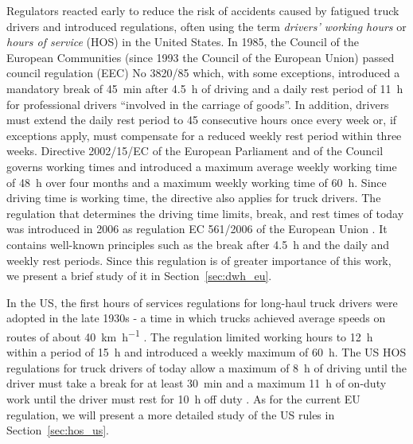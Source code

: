 Regulators reacted early to reduce the risk of accidents caused by fatigued truck drivers and introduced regulations, often using the term \emph{drivers' working hours} or \emph{hours of service} (HOS) in the United States. In 1985, the Council of the European Communities (since 1993 the Council of the European Union) passed council regulation (EEC) No 3820/85 \cite{counciloftheeuropeancommunities:1985} which, with some exceptions, introduced a mandatory break of \SI{45}{\minute} after \SI{4.5}{\hour} of driving and a daily rest period of \SI{11}{\hour} for professional drivers ``involved in the carriage of goods''. In addition, drivers must extend the daily rest period to \si{45} consecutive hours once every week or, if exceptions apply, must compensate for a reduced weekly rest period within three weeks. Directive 2002/15/EC \cite{europeanparliament:2002} of the European Parliament and of the Council governs working times and introduced a maximum average weekly working time of \SI{48}{\hour} over four months and a maximum weekly working time of \SI{60}{\hour}. Since driving time is working time, the directive also applies for truck drivers. The regulation that determines the driving time limits, break, and rest times of today was introduced in 2006 as regulation EC 561/2006 of the European Union \cite{europeanparliament:2006}. It contains well-known principles such as the break after \SI{4.5}{\hour} and the daily and weekly rest periods. Since this regulation is of greater importance of this work, we present a brief study of it in Section~\ref{sec:dwh_eu}.

In the US, the first hours of services regulations for long-haul truck drivers were adopted in the late 1930s - a time in which trucks achieved average speeds on routes of about \SI[per-mode = symbol]{40}{\km\per\hour} \cite{federalmotorcarriersafetyadministrationfmcsa:2000}. The regulation limited working hours to \SI{12}{\hour} within a period of \SI{15}{\hour} and introduced a weekly maximum of \SI{60}{\hour}. The US HOS regulations for truck drivers of today allow a maximum of \SI{8}{\hour} of driving until the driver must take a break for at least \SI{30}{\minute} and a maximum \SI{11}{\hour} of on-duty work until the driver must rest for \SI{10}{\hour} off duty \cite{federalmotorcarriersafetyadministrationfmcsa:2011}. As for the current EU regulation, we will present a more detailed study of the US rules in Section~\ref{sec:hos_us}.


